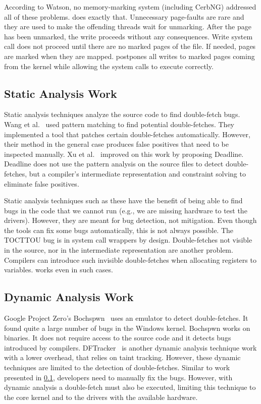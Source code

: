 According to Watson, no memory-marking system (including CerbNG) addressed all
of these problems. \sysname does exactly that. Unnecessary page-faults are rare
and they are used to make the offending threads wait for unmarking. After the
page has been unmarked, the write proceeds without any consequences. Write
system call does not proceed until there are no marked pages of the file. If
needed, pages are marked when they are mapped. \sysname postpones all writes to
marked pages coming from the kernel while allowing the system calls to execute
correctly.

\subsection{Static Analysis Work}
\label{subsec:dfstatic}
Static analysis techniques analyze the source code to find double-fetch bugs.
Wang et al.~\cite{wang2017double} used pattern matching to find potential
double-fetches. They implemented a tool that patches certain double-fetches
automatically. However, their method in the general case produces false
positives that need to be inspected manually. Xu et al.~\cite{xu2018precise}
improved on this work by proposing Deadline. Deadline does not use the pattern 
analysis on the source files to detect double-fetches, but a compiler's
intermediate representation and constraint solving to eliminate false positives.

Static analysis techniques such as these have the benefit of being able to find
bugs in the code that we cannot run (e.g., we are missing hardware to test the
drivers). However, they are meant for bug detection, not mitigation. Even though
the tools can fix some bugs automatically, this is not always possible. The
TOCTTOU bug is in system call wrappers by design. Double-fetches not visible in
the source, nor in the intermediate representation are another problem.
Compilers can introduce such invisible double-fetches when allocating registers
to variables. \sysname works even in such cases.


\subsection{Dynamic Analysis Work}
\label{subsec:dfdynamic}
Google Project Zero's Bochspwn~\cite{jurczyk2013bochspwn} uses an emulator to
detect double-fetches. It found quite a large number of bugs in the Windows
kernel. Bochspwn works on binaries. It does not require access to the source
code and it detects bugs introduced by compilers.
DFTracker~\cite{wang2019dftracker} is another dynamic analysis technique work
with a lower overhead, that relies on taint tracking. However, these dynamic
techniques are limited to the detection of double-fetches. Similar to work
presented in \cref{subsec:dfstatic}, developers need to manually fix the bugs.
However, with dynamic analysis a double-fetch must also be executed, limiting
this technique to the core kernel and to the drivers with the available
hardware.

